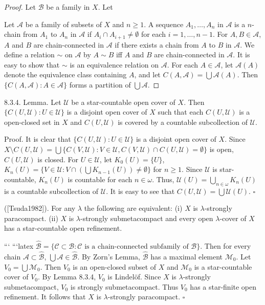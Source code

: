 \documentclass[jiang8iv.tex]{subfiles}
\begin{document}
\begin{proof}
	Let $\mathscr{B}$ be a family in $X$. Let
	
	Let \(\mathscr{A}\) be a family of subsets of \(X\) and \(n\ge 1\). A sequence \(A_1,\dots,A_n\) in \(\mathscr{A}\) is a \(n\)-chain from \(A_1\) to \(A_n\) in \(\mathscr{A}\) if \(A_i\cap A_{i+1}\neq\emptyset\) for each \(i=1,\dots,n-1\). For \(A,B\in\mathscr{A}\), \(A\) and \(B\) are chain-connected in \(\mathscr{A}\) if there exists a chain from \(A\) to \(B\) in \(\mathscr{A}\). We define a relation \(\sim\) on \(\mathscr{A}\) by \(A\sim B\) iff
 \(A\) and \(B\) are chain-connected in \(\mathscr{A}\). It is easy to show that \(\sim\) is an equivalence relation on \(\mathscr{A}\). For each \(A\in\mathscr{A}\), let \(\mathscr{A}(A)\) denote the equivalence class containing \(A\), and let \(C(A,\mathscr{A})=\bigcup\mathscr{A}(A)\). Then \(\{C(A,\mathscr{A}): A\in\mathscr{A}\}\) forms a partition of \(\bigcup\mathscr{A}\).
\end{proof} 

8.3.4. Lemma. Let \(\mathscr{U}\) be a star-countable open cover of \(X\). Then \(\{C(U,\mathscr{U}): U\in\mathscr{U}\}\) is a disjoint open cover of \(X\) such that each \(C(U,\mathscr{U})\) is a open-closed set in \(X\) and \(C(U,\mathscr{U})\) is covered by a countable subcollection of \(\mathscr{U}\).

Proof. It is clear that \(\{C(U,\mathscr{U}): U\in\mathscr{U}\}\) is a disjoint open cover of \(X\). Since \(X\setminus C(U,\mathscr{U})=\bigcup\{C(V,\mathscr{U}): V\in\mathscr{U}, C(V,\mathscr{U})\cap C(U,\mathscr{U})=\emptyset\}\) is open, \(C(U,\mathscr{U})\) is closed. For \(U\in\mathscr{U}\), let \(K_0(U)=\{U\}\), \(K_n(U)=\{V\in\mathscr{U}: V\cap(\bigcup K_{n-1}(U))\neq\emptyset\}\) for \(n\ge 1\). Since \(\mathscr{U}\) is star-countable, \(K_n(U)\) is countable for each \(n\in\omega\). Thus, \(\mathscr{U}(U)=\bigcup_{n\in\omega}K_n(U)\) is a countable subcollection of \(\mathscr{U}\). It is easy to see that \(C(U,\mathscr{U})=\bigcup\mathscr{U}(U)\). \(\square\)


{\theorem{\label{th:8.3.5}} 
	([Tsuda1982]). For any \(\lambda\) the following are equivalent:
	(i) \(X\) is \(\lambda\)-strongly paracompact.
	(ii) \(X\) is \(\lambda\)-strongly submetacompact and every open \(\lambda\)-cover of \(X\) has a star-countable open refinement.
}

```
```latex
\(\hat{\mathscr{B}}=\{\mathscr{C}\subset\mathscr{B}:\mathscr{C}\text{ is a chain-connected subfamily of }\mathscr{B}\}\). Then for every chain \(\mathscr{A}\subset\hat{\mathscr{B}}\), \(\bigcup\mathscr{A}\in\hat{\mathscr{B}}\).
By Zorn's Lemma, \(\hat{\mathscr{B}}\) has a maximal element \(\mathscr{M}_0\). Let \(V_0=\bigcup\mathscr{M}_0\). Then \(V_0\) is an open-closed subset of \(X\) and \(\mathscr{M}_0\) is a star-countable cover of \(V_0\). By Lemma 8.3.4, \(V_0\) is Lindelöf. Since \(X\) is \(\lambda\)-strongly submetacompact, \(V_0\) is strongly submetacompact. Thus \(V_0\) has a star-finite open refinement. It follows that \(X\) is \(\lambda\)-strongly paracompact. \(\square\)
\end{document}
